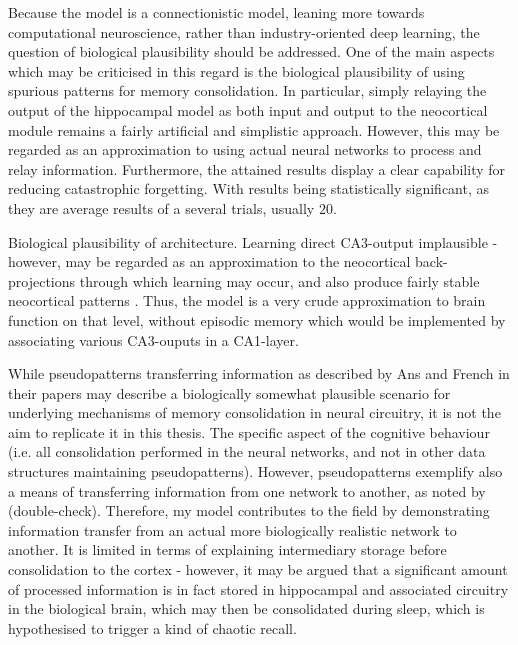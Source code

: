 Because the model is a connectionistic model, leaning more towards computational neuroscience, rather than industry-oriented deep learning, the question of biological plausibility should be addressed. One of the main aspects which may be criticised in this regard is the biological plausibility of using spurious patterns for memory consolidation. In particular, simply relaying the output of the hippocampal model as both input and output to the neocortical module remains a fairly artificial and simplistic approach. However, this may be regarded as an approximation to using actual neural networks to process and relay information. Furthermore, the attained results display a clear capability for reducing catastrophic forgetting. With results being statistically significant, as they are average results of a several trials, usually $20$.

Biological plausibility of \citep{McClelland1995} architecture. Learning direct CA3-output implausible - however, may be regarded as an approximation to the neocortical back-projections through which learning may occur, and also produce fairly stable neocortical patterns \citep{Rolls1998chpt6}. Thus, the model is a very crude approximation to brain function on that level, without episodic memory which would be implemented by associating various CA3-ouputs in a CA1-layer.

While pseudopatterns transferring information as described by Ans and French in their papers may describe a biologically somewhat plausible scenario for underlying mechanisms of memory consolidation in neural circuitry, it is not the aim to replicate it in this thesis. The specific aspect of the cognitive behaviour (i.e. all consolidation performed in the neural networks, and not in other data structures maintaining pseudopatterns). However, pseudopatterns exemplify also a means of transferring information from one network to another, as noted by \cite{Ans1997} (double-check). Therefore, my model contributes to the field by demonstrating information transfer from an actual more biologically realistic network to another. It is limited in terms of explaining intermediary storage before consolidation to the cortex - however, it may be argued that a significant amount of processed information is in fact stored in hippocampal and associated circuitry in the biological brain, which may then be consolidated during sleep, which is hypothesised to trigger a kind of chaotic recall.



